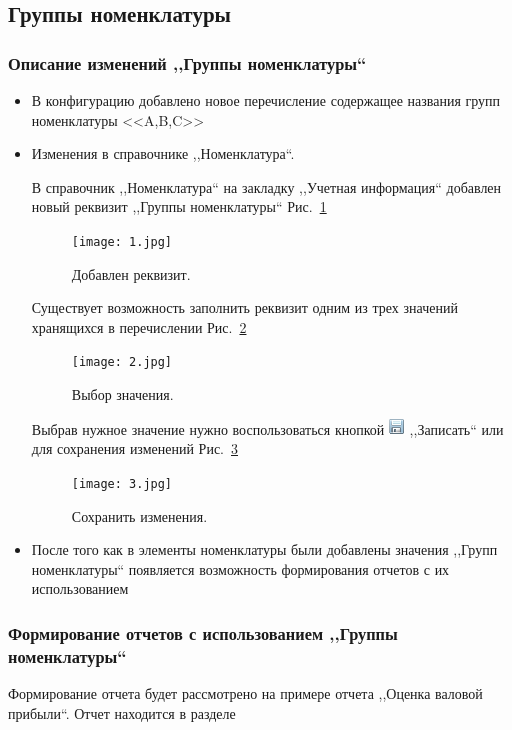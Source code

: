\subsection{Группы номенклатуры}
\subsubsection{Описание изменений ,,Группы номенклатуры``}
\begin{itemize}	
	\item В конфигурацию добавлено новое перечисление содержащее названия групп номенклатуры <<A,B,C>> 
	\item Изменения в справочнике ,,Номенклатура``.\par
	В справочник ,,Номенклатура`` на закладку ,,Учетная информация`` добавлен новый реквизит ,,Группы номенклатуры`` Рис.~\ref{ris:1.jpg}	
	\begin{figure}[H]
		\texttt{[image: 1.jpg]}
		\caption{Добавлен реквизит.}
		\label{ris:1.jpg}
	\end{figure}
   Существует возможность заполнить  реквизит одним из трех значений хранящихся в перечислении Рис.~\ref{ris:2.jpg}	
	\begin{figure}[H]
		\texttt{[image: 2.jpg]}
		\caption{Выбор значения.}
		\label{ris:2.jpg}
	\end{figure}
	Выбрав нужное значение нужно воспользоваться кнопкой 
	\includegraphics[width=0.02\linewidth]{images/sv} ,,Записать``  или   для сохранения изменений Рис.~\ref{ris:3.jpg}
	\begin{figure}[H]
		\texttt{[image: 3.jpg]}
		\caption{Сохранить изменения.}
		\label{ris:3.jpg}
	\end{figure}
	\item После того как в элементы номенклатуры были добавлены значения  ,,Групп номенклатуры`` появляется возможность формирования отчетов с их использованием
\end{itemize}

\subsubsection{Формирование отчетов с использованием ,,Группы номенклатуры``}
	Формирование отчета будет рассмотрено на примере отчета ,,Оценка валовой прибыли``. Отчет находится в разделе 
	
